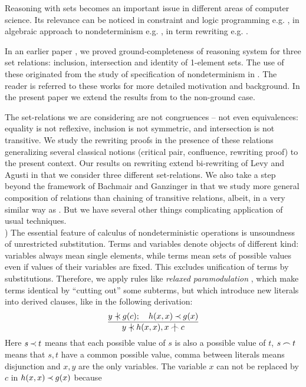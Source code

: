 Reasoning with sets becomes an important issue in different areas of computer
science. Its relevance can be noticed in constraint and logic programming
e.g.  \cite {SD,DO,Jay,Sto}, in algebraic approach to nondeterminism e.g.
\cite {HusB,PS1,MW}, in term rewriting e.g. \cite {LA,Kap,HusB}.

In an earlier paper \cite{KW}, we proved ground-completeness of reasoning
system for three set relations:  inclusion, intersection  and
identity of 1-element sets. The use of these originated from the study
of specification of nondeterminism in \cite{Mich,MW-II,MW}. The reader is referred
to these works for more detailed motivation and background.
In the present paper we extend the results from \cite{KW} to the non-ground case.

The
set-relations we are considering are not congruences -- not even equivalences: 
equality is not reflexive, inclusion is  not symmetric,
 and intersection is not transitive. 
We study the rewriting proofs in the presence of these
relations generalizing several classical notions (critical pair, confluence,
rewriting proof) to the present context. Our results on rewriting extend
bi-rewriting of Levy and Agusti \cite{LA} in that we consider three different
set-relations. We also take a step beyond the framework of Bachmair and
Ganzinger \cite{BG249} in that we study more general composition of relations
than chaining of transitive relations, albeit, in a very similar way as \cite
{BG-Oslo}.  But we have several other things complicating application of usual
techniques. \\[1ex]
%
) 
The essential feature of calculus of nondeterministic operations is
unsoundness of unrestricted substitution. Terms and variables denote objects
of different kind: variables always mean single elements, while terms mean
sets of possible values even if values of their variables are fixed.  This
excludes unification of terms by substitutions.  Therefore, we apply rules
like {\em relaxed paramodulation} \cite {relaxed-par}, which make terms
identical by ``cutting out'' some subterms, but which introduce new literals
into derived clauses, like in the following derivation:
\[
\prule {y\notIncl g(c); \quad h(x,x)\Incl g(x)}{y\notIncl h(x,x), x\notInt c}
\] 
Here \(s\mathbin{\prec} t\) means that each possible value of $s$ is also a possible
value of $t$, \(s\mathbin{\frown} t\) means that $s,t$ have a common possible value,
comma between literals means disjunction and $x,y$ are the only variables.
The variable $x$ can not be replaced by $c$ in \(h(x,x)\mathbin{\prec} g(x)\) because
